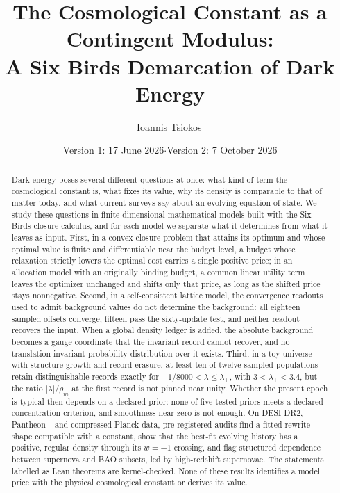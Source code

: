 \documentclass[11pt]{article}
\title{The Cosmological Constant as a Contingent Modulus:\\ A Six Birds Demarcation of Dark Energy}
\author{Ioannis Tsiokos\,\orcidlink{0009-0009-7659-5964}}
\date{Version 1: 17 June 2026\quad$\cdot$\quad Version 2: 7 October 2026}
\theoremstyle{definition}
\begin{document}
\maketitle
\thispagestyle{firstpage}

\begin{abstract}
Dark energy poses several different questions at once: what kind of term
the cosmological constant is, what fixes its value, why its density is
comparable to that of matter today, and what current surveys say about
an evolving equation of state. We study these questions in
finite-dimensional mathematical models built with the Six Birds closure
calculus, and for each model we separate what it determines from what it
leaves as input. First, in a convex closure problem that attains its
optimum and whose optimal value is finite and differentiable near the
budget level, a budget whose relaxation strictly lowers the optimal cost
carries a single positive price; in an allocation model with an
originally binding budget, a common linear utility term leaves the
optimizer unchanged and shifts only that price, as long as the shifted
price stays nonnegative. Second, in a self-consistent lattice model, the
convergence readouts used to admit background values do not determine
the background: all eighteen sampled offsets converge, fifteen pass the
sixty-update test, and neither readout recovers the input. When a global
density ledger is added, the absolute background becomes a gauge
coordinate that the invariant record cannot recover, and no
translation-invariant probability distribution over it exists. Third, in
a toy universe with structure growth and record erasure, at least ten of
twelve sampled populations retain distinguishable records exactly for
\(-1/8000<\lambda\le\lambda_+\), with \(3<\lambda_+<3.4\), but the ratio
\(|\lambda|/\rho_m\) at the first record is not pinned near unity.
Whether the present epoch is typical then depends on a declared prior:
none of five tested priors meets a declared concentration criterion, and
smoothness near zero is not enough. On DESI DR2, Pantheon+ and
compressed Planck data, pre-registered audits find a fitted rewrite
shape compatible with a constant, show that the best-fit evolving
history has a positive, regular density through its \(w=-1\) crossing,
and flag structured dependence between supernova and BAO subsets, led by
high-redshift supernovae. The statements labelled as Lean theorems are
kernel-checked. None of these results identifies a model price with the
physical cosmological constant or derives its value.
\end{abstract}
\end{document}
